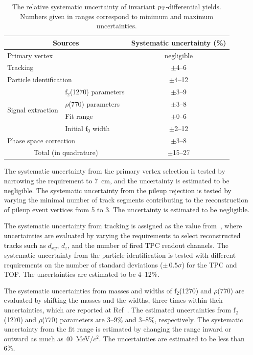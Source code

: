 \begin{table}[h!]
\caption{The relative systematic uncertainty of invariant $p_{\rm{T}}$-differential yields. Numbers given in ranges correspond to minimum and maximum uncertainties.}
\centering
\begin{tabular}{ll|c}
\hline 
\multicolumn{2}{c|}{Sources}  &Systematic uncertainty (\%) \\ \hline
\multicolumn{2}{l|}{Primary vertex} & negligible \\ 
\multicolumn{2}{l|}{Tracking} & $\pm$4--6 \\
\multicolumn{2}{l|}{Particle identification} & $\pm$4--12 \\ 
\multirow{4}{*}{Signal extraction} &  $\mathrm{f}_{2}$(1270) parameters	& $\pm$3--9 \\ 
& $\rho$(770) parameters & $\pm$3--8 \\
& Fit range & $\pm$0--6 \\
& Initial $\mathrm{f}_{0}$ width & $\pm$2--12 \\
\multicolumn{2}{l|}{Phase space correction} & $\pm$3--8 \\ \hline 
\multicolumn{2}{c|}{Total (in quadrature)}	& $\pm$15--27 \\ 
\hline 
\end{tabular}
\label{tab:syst}
\end{table}

The systematic uncertainty from the primary vertex selection is tested by narrowing the requirement to 7~cm, and the uncertainty is estimated to be negligible. The systematic uncertainty from the pileup rejection is tested by varying the minimal number of track segments contributing to the reconstruction of pileup event vertices from 5 to 3. The uncertainty is estimated to be negligible.

The systematic uncertainty from tracking is assigned as the value from~\cite{ALICE:2013wgn}, where uncertainties are evaluated by varying the requirements to select reconstructed tracks such as $d_{xy}$, $d_{z}$, and the number of fired TPC readout channels. The systematic uncertainty from the particle identification is tested with different requirements on the number of standard deviations ($\pm\,0.5\sigma$) for the TPC and TOF. The uncertainties are estimated to be 4--12\%.

The systematic uncertainties from masses and widths of $\mathrm{f}_{2}$(1270) and $\rho$(770) are evaluated by shifting the masses and the widths, three times within their uncertainties, which are reported at Ref~\cite{ParticleDataGroup:2022pth}. The estimated uncertainties from $\mathrm{f}_{2}$(1270) and $\rho$(770) parameters are 3--9\% and 3--8\%, respectively. The systematic uncertainty from the fit range is estimated by changing the range inward or outward as much as 40~MeV/$c^{2}$. The uncertainties are estimated to be 
less than 6\%.


